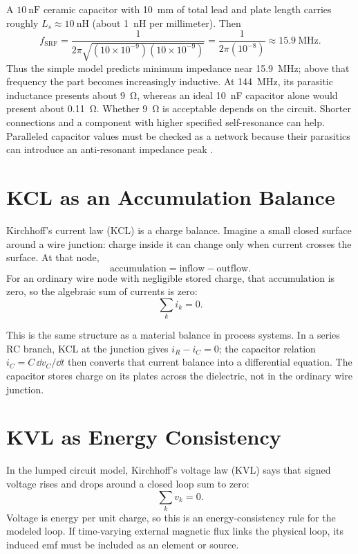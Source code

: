 \begin{workedbox}
A \(\SI{10}{\nano\farad}\) ceramic capacitor with \SI{10}{\milli\meter} of total lead
and plate length carries roughly \(L_s\approx\SI{10}{\nano\henry}\)
(about \SI{1}{\nano\henry} per millimeter). Then
\[
f_{\mathrm{SRF}}=\frac{1}{2\pi\sqrt{(10\times10^{-9})(10\times10^{-9})}}
=\frac{1}{2\pi(10^{-8})}\approx\SI{15.9}{\mega\hertz}.
\]
Thus the simple model predicts minimum impedance near
\SI{15.9}{\mega\hertz}; above that frequency the part becomes increasingly
inductive. At \SI{144}{\mega\hertz}, its parasitic inductance presents about
\SI{9}{\ohm}, whereas an ideal \SI{10}{\nano\farad} capacitor alone would present
about \SI{0.11}{\ohm}. Whether \SI{9}{\ohm} is acceptable depends on the circuit.
Shorter connections and a component with higher specified self-resonance can help.
Paralleled capacitor values must be checked as a network because their parasitics
can introduce an anti-resonant impedance peak
\cite[pp.~5--9]{bowick2008rfcircuit}.
\end{workedbox}

\section{KCL as an Accumulation Balance}
Kirchhoff's current law (KCL) is a charge balance. Imagine a small closed surface
around a wire junction: charge inside it can change only when current crosses the
surface. At that node,
\[
\text{accumulation}=\text{inflow}-\text{outflow}.
\]
For an ordinary wire node with negligible stored charge, that accumulation is
zero, so the algebraic sum of currents is zero:
\[
\sum_k i_k=0.
\]
\cite[pp.~27--32]{white2004highfrequency}

\begin{controlsbox}
This is the same structure as a material balance in process systems. In a series
RC branch, KCL at the junction gives \(i_R-i_C=0\); the capacitor relation
\(i_C=C\,\dd v_C/\dd t\) then converts that current balance into a differential
equation. The capacitor stores charge on its plates across the dielectric, not in
the ordinary wire junction.
\end{controlsbox}

\section{KVL as Energy Consistency}
In the lumped circuit model, Kirchhoff's voltage law (KVL) says that signed voltage
rises and drops around a closed loop sum to zero:
\[
\sum_k v_k=0.
\]
Voltage is energy per unit charge, so this is an energy-consistency rule for the
modeled loop. If time-varying external magnetic flux links the physical loop, its
induced emf must be included as an element or source.

